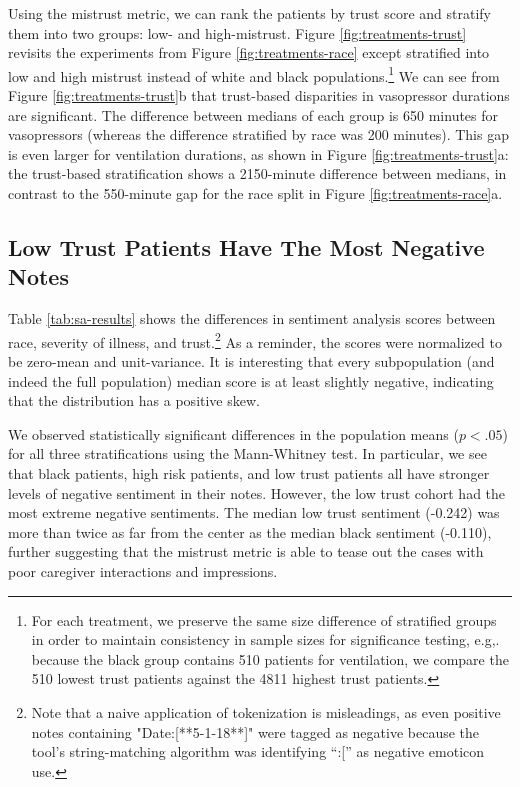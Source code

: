 \documentclass{article}
\begin{document}
Using the mistrust metric, we can rank the patients by trust score and stratify them into two groups: low- and high-mistrust. Figure \ref{fig:treatments-trust} revisits the experiments from Figure \ref{fig:treatments-race} except stratified into low and high mistrust instead of white and black populations.\footnote{For each treatment, we preserve the same size difference of stratified groups in order to maintain consistency in sample sizes for significance testing, e.g,. because the black group contains 510 patients for ventilation, we compare the 510 lowest trust patients against the 4811 highest trust patients.} We can see from Figure \ref{fig:treatments-trust}b that trust-based disparities in vasopressor durations are significant. The difference between medians of each group is 650 minutes for vasopressors (whereas the difference stratified by race was 200 minutes). This gap is even larger for ventilation durations, as shown in Figure \ref{fig:treatments-trust}a: the trust-based stratification shows a 2150-minute difference between medians, in contrast to the 550-minute gap for the race split in Figure \ref{fig:treatments-race}a.




\subsection{Low Trust Patients Have The Most Negative Notes}

Table \ref{tab:sa-results} shows the differences in sentiment analysis scores between race, severity of illness, and trust.\footnote{Note that a naive application of tokenization is misleadings, as even positive notes containing "Date:[**5-1-18**]" were tagged as negative because the tool's string-matching algorithm was identifying ``:['' as negative emoticon use.} As a reminder, the scores were normalized to be zero-mean and unit-variance. It is interesting that every subpopulation (and indeed the full population) median score is at least slightly negative, indicating that the distribution has a positive skew.

We observed statistically significant differences in the population means ($p<.05$) for all three stratifications using the Mann-Whitney test. In particular, we see that black patients, high risk patients, and low trust patients all have stronger levels of negative sentiment in their notes. However, the low trust cohort had the most extreme negative sentiments. The median low trust sentiment (-0.242) was more than twice as far from the center as the median black sentiment (-0.110), further suggesting that the mistrust metric is able to tease out the cases with poor caregiver interactions and impressions.
\end{document}
